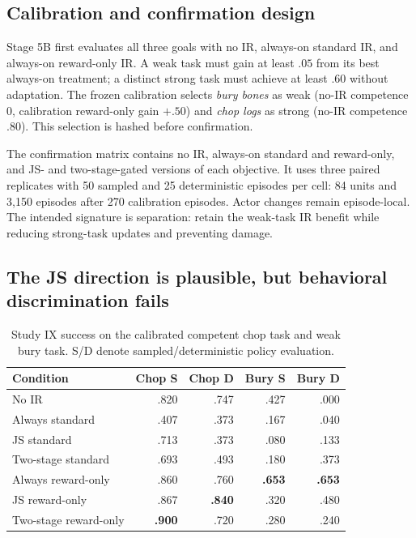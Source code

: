 \documentclass[10pt]{article}
\begin{document}
\subsection{Calibration and confirmation design}

Stage 5B first evaluates all three goals with no IR, always-on standard IR,
and always-on reward-only IR. A weak task must gain at least $.05$ from its
best always-on treatment; a distinct strong task must achieve at least $.60$
without adaptation. The frozen calibration selects \emph{bury bones} as weak
(no-IR competence $0$, calibration reward-only gain $+.50$) and
\emph{chop logs} as strong (no-IR competence $.80$). This selection is hashed
before confirmation.

The confirmation matrix contains no IR, always-on standard and reward-only,
and JS- and two-stage-gated versions of each objective. It uses three paired
replicates with 50 sampled and 25 deterministic episodes per cell: 84 units
and 3,150 episodes after 270 calibration episodes. Actor changes remain
episode-local. The intended signature is separation: retain the weak-task IR
benefit while reducing strong-task updates and preventing damage.

\subsection{The JS direction is plausible, but behavioral discrimination fails}

\begin{table}[H]
\centering
\small
\caption{Study IX success on the calibrated competent chop task and weak bury task. S/D denote sampled/deterministic policy evaluation.}
\label{tab:stage5bnecessity}
\begin{tabular}{lrrrr}
\toprule
Condition & Chop S & Chop D & Bury S & Bury D \\
\midrule
No IR & .820 & .747 & .427 & .000 \\
Always standard & .407 & .373 & .167 & .040 \\
JS standard & .713 & .373 & .080 & .133 \\
Two-stage standard & .693 & .493 & .180 & .373 \\
Always reward-only & .860 & .760 & \textbf{.653} & \textbf{.653} \\
JS reward-only & .867 & \textbf{.840} & .320 & .480 \\
Two-stage reward-only & \textbf{.900} & .720 & .280 & .240 \\
\bottomrule
\end{tabular}
\end{table}
\end{document}
